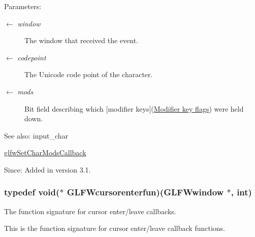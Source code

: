 \begin{Desc}
\item[Parameters:]
\begin{description}
\item[\mbox{$\leftarrow$} {\em window}]The window that received the event. \item[\mbox{$\leftarrow$} {\em codepoint}]The Unicode code point of the character. \item[\mbox{$\leftarrow$} {\em mods}]Bit field describing which \mbox{[}modifier keys\mbox{]}(\hyperlink{group__mods}{Modifier key flags}) were held down.\end{description}
\end{Desc}
\begin{Desc}
\item[See also:]input\_\-char 

\hyperlink{group__input_ge6eee0bda7429bfe8028615847cf6795}{glfwSetCharModsCallback}\end{Desc}
\begin{Desc}
\item[Since:]Added in version 3.1. \end{Desc}
\hypertarget{group__input_g762d898d9b0241d7e3e3b767c6cf318f}{
\subsubsection[GLFWcursorenterfun]{\setlength{\rightskip}{0pt plus 5cm}typedef void($\ast$  {\bf GLFWcursorenterfun})({\bf GLFWwindow} $\ast$, int)}}
\label{group__input_g762d898d9b0241d7e3e3b767c6cf318f}


The function signature for cursor enter/leave callbacks. 

This is the function signature for cursor enter/leave callback functions.

